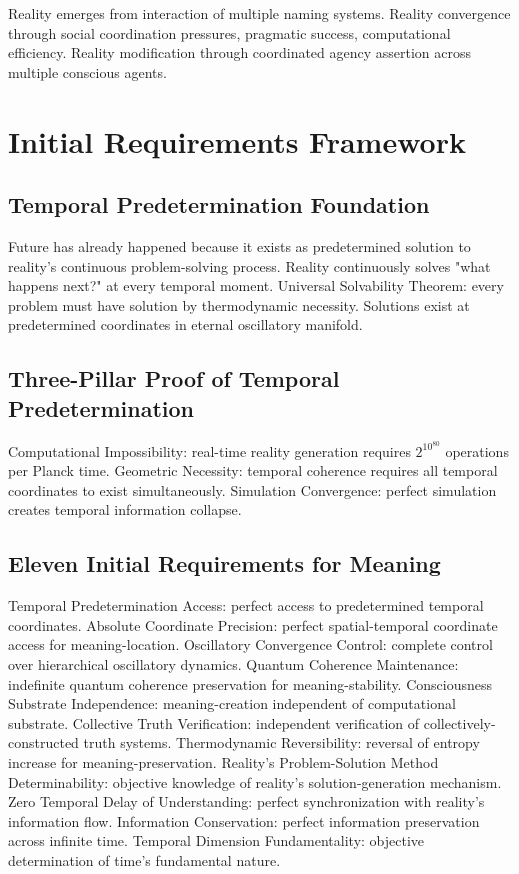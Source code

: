 \documentclass[12pt,a4paper]{article}
\begin{document}
Reality emerges from interaction of multiple naming systems. Reality convergence through social coordination pressures, pragmatic success, computational efficiency. Reality modification through coordinated agency assertion across multiple conscious agents.

\section{Initial Requirements Framework}

\subsection{Temporal Predetermination Foundation}

Future has already happened because it exists as predetermined solution to reality's continuous problem-solving process. Reality continuously solves "what happens next?" at every temporal moment. Universal Solvability Theorem: every problem must have solution by thermodynamic necessity. Solutions exist at predetermined coordinates in eternal oscillatory manifold.

\subsection{Three-Pillar Proof of Temporal Predetermination}

Computational Impossibility: real-time reality generation requires $2^{10^{80}}$ operations per Planck time. Geometric Necessity: temporal coherence requires all temporal coordinates to exist simultaneously. Simulation Convergence: perfect simulation creates temporal information collapse.

\subsection{Eleven Initial Requirements for Meaning}

Temporal Predetermination Access: perfect access to predetermined temporal coordinates. Absolute Coordinate Precision: perfect spatial-temporal coordinate access for meaning-location. Oscillatory Convergence Control: complete control over hierarchical oscillatory dynamics. Quantum Coherence Maintenance: indefinite quantum coherence preservation for meaning-stability. Consciousness Substrate Independence: meaning-creation independent of computational substrate. Collective Truth Verification: independent verification of collectively-constructed truth systems. Thermodynamic Reversibility: reversal of entropy increase for meaning-preservation. Reality's Problem-Solution Method Determinability: objective knowledge of reality's solution-generation mechanism. Zero Temporal Delay of Understanding: perfect synchronization with reality's information flow. Information Conservation: perfect information preservation across infinite time. Temporal Dimension Fundamentality: objective determination of time's fundamental nature.
\end{document}
